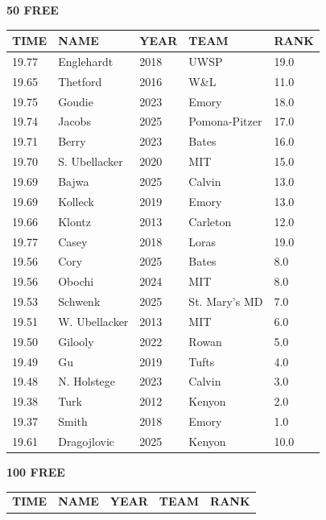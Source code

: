 \begin{table}[H]
\centering
\begin{minipage}[t]{0.48\textwidth}
\centering
\textbf{50 FREE}\\[0.1cm]
\begin{tabular}{@{}p{1.8cm}p{2.8cm}p{1.2cm}p{1.4cm}p{0.8cm}@{}}
\hline
    \textbf{TIME} & \textbf{NAME} & \textbf{YEAR} & \textbf{TEAM} & \textbf{RANK} \\
\hline
    19.77 & Englehardt & 2018 & UWSP & 19.0 \\
    19.65 & Thetford & 2016 & W\&L & 11.0 \\
    19.75 & Goudie & 2023 & Emory & 18.0 \\
    19.74 & Jacobs & 2025 & Pomona-Pitzer & 17.0 \\
    19.71 & Berry & 2023 & Bates & 16.0 \\
    19.70 & S. Ubellacker & 2020 & MIT & 15.0 \\
    19.69 & Bajwa & 2025 & Calvin & 13.0 \\
    19.69 & Kolleck & 2019 & Emory & 13.0 \\
    19.66 & Klontz & 2013 & Carleton & 12.0 \\
    19.77 & Casey & 2018 & Loras & 19.0 \\
    19.56 & Cory & 2025 & Bates & 8.0 \\
    19.56 & Obochi & 2024 & MIT & 8.0 \\
    19.53 & Schwenk & 2025 & St. Mary's MD & 7.0 \\
    19.51 & W. Ubellacker & 2013 & MIT & 6.0 \\
    19.50 & Gilooly & 2022 & Rowan & 5.0 \\
    19.49 & Gu & 2019 & Tufts & 4.0 \\
    19.48 & N. Holstege & 2023 & Calvin & 3.0 \\
    19.38 & Turk & 2012 & Kenyon & 2.0 \\
    19.37 & Smith & 2018 & Emory & 1.0 \\
    19.61 & Dragojlovic & 2025 & Kenyon & 10.0 \\
\hline
\end{tabular}
\end{minipage}\hfill
\begin{minipage}[t]{0.48\textwidth}
\centering
\textbf{100 FREE}\\[0.1cm]
\begin{tabular}{@{}p{1.8cm}p{2.8cm}p{1.2cm}p{1.4cm}p{0.8cm}@{}}
\hline
    \textbf{TIME} & \textbf{NAME} & \textbf{YEAR} & \textbf{TEAM} & \textbf{RANK} \\

\end{tabular}
\end{minipage}
\end{table}
